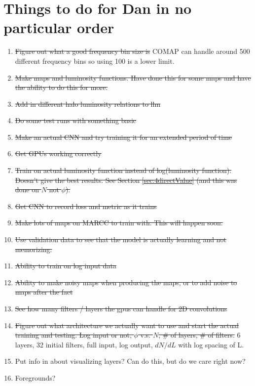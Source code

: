 \documentclass{article}
\begin{document}
	\section{Things to do for Dan in no particular order} \label{sec:todo}
		\begin{enumerate}
			\item \sout{Figure out what a good frequency bin size is}  COMAP can handle around 500 different frequency bins so using 100 is a lower limit.

			\item \sout{Make maps and luminosity functions. Have done this for some maps and have the ability to do this for more.}

			\item \sout{Add in different halo luminosity relations to llm}

			\item \sout{Do some test runs with something basic}

			\item \sout{Make an actual CNN and try training it for an extended period of time}

			\item \sout{Get GPUs working correctly}

			\item \sout{Train on actual luminosity function instead of log(luminosity function). Doesn't give the best results.  See Section \ref{sec:4directValue} (and this was done on \(N\) not \(\phi\)).}

			\item \sout{Get CNN to record loss and metric as it trains}

			\item \sout{Make lots of maps on MARCC to train with.  This will happen soon.}

			\item \sout{Use validation data to see that the model is actually learning and not memorizing.}

			\item \sout{Ability to train on log input data}

			\item \sout{Ability to make noisy maps when producing the maps, or to add noise to maps after the fact}

			\item \sout{See how many filters / layers the gpus can handle for 2D convolutions}

			\item \sout{Figure out what architecture we actually want to use and start the actual training and testing.  Log input or not, \(\phi\) v.s. \(N\), \# of layers, \# of filters.}  6 layers, 32 initial filters, full input, log output, \(dN/dL\) with log spacing of L.

			\item Put info in about visualizing layers?  Can do this, but do we care right now?

			\item Foregrounds?
		\end{enumerate}


	
% 
\end{document}
